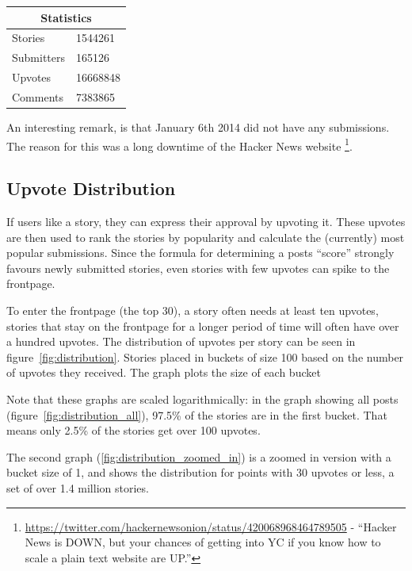 \begin{center}
    \begin{tabular}{|p{3cm}|p{3cm}|}
        \hline
        \multicolumn{2}{|c|}{Statistics} \\
        \hline
         Stories & 1544261 \\ 
         Submitters & 165126 \\ 
         Upvotes & 16668848 \\ 
         Comments & 7383865 \\
         \hline
    \end{tabular}
\end{center}

An interesting remark, is that January 6th 2014 did not have any submissions. The reason for this was a long downtime of the Hacker News website
\footnote{\url{https://twitter.com/hackernewsonion/status/420068968464789505} - ``Hacker News is DOWN, but your chances of getting into YC if you know how to scale a plain text website are UP.''}.

\subsection{Upvote Distribution}
If users like a story, they can express their approval by upvoting it. These upvotes are then used to rank the stories by popularity and calculate the (currently) most popular submissions. Since the formula for determining a posts ``score'' strongly favours newly submitted stories, even stories with few upvotes can spike to the frontpage.

To enter the frontpage (the top 30), a story often needs at least ten upvotes, stories that stay on the frontpage for a longer period of time will often have over a hundred upvotes. The distribution of upvotes per story can be seen in figure~\ref{fig:distribution}. Stories placed in buckets of size 100 based on the number of upvotes they received. The graph plots the size of each bucket

Note that these graphs are scaled logarithmically: in the graph showing all posts (figure~\ref{fig:distribution_all}), 97.5\% of the stories are in the first bucket. That means only 2.5\% of the stories get over 100 upvotes. 

The second graph (\ref{fig:distribution_zoomed_in}) is a zoomed in version with a bucket size of 1, and shows the distribution for points with 30 upvotes or less, a set of over 1.4 million stories.

